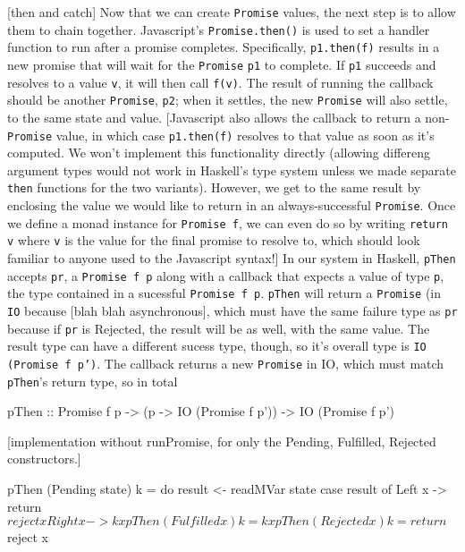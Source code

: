 \documentclass[12pt, english, letterpaper]{kuthesis}
\newcommand{\lit}[1]{\texttt{#1}}
\begin{document}
[then and catch]
Now that we can create \lit{Promise} values, the next step is to allow them to chain together.  Javascript's \lit{Promise.then()} is used to set a handler function to run after a promise completes.  Specifically, \lit{p1.then(f)} results in a new promise that will wait for the \lit{Promise} \lit{p1} to complete.  If \lit{p1} succeeds and resolves to a value \lit v, it will then call \lit{f(v)}.  The result of running the callback should be another \lit{Promise}, \lit{p2}; when it settles, the new \lit{Promise} will also settle, to the same state and value.
[Javascript also allows the callback to return a non-\lit{Promise} value, in which case \lit{p1.then(f)} resolves to that value as soon as it's computed.  We won't implement this functionality directly
(allowing differeng argument types would not work in Haskell's type system unless we made separate \lit{then} functions for the two variants).  However, we get to the same result by enclosing the value we would like to return in an always-successful \lit{Promise}.  Once we define a monad instance for \lit{Promise f}, we can even do so by writing \lit{return v} where \lit{v} is the value for the final promise to resolve to, which should look familiar to anyone used to the Javascript syntax!]
In our system in Haskell, \lit{pThen} accepts \lit{pr}, a \lit{Promise f p} along with a callback that expects a value of type \lit p, the type contained in a sucessful \lit{Promise f p}.  \lit{pThen} will return a \lit{Promise} (in \lit{IO} because [blah blah asynchronous], which must have the same failure type as \lit{pr} because if \lit{pr} is Rejected, the result will be as well, with the same value.  The result type can have a different sucess type, though, so it's overall type is \lit{IO (Promise f p')}.  The callback returns a new \lit{Promise} in IO, which must match \lit{pThen}'s return type, so in total
\begin{code}
pThen :: Promise f p
        -> (p -> IO (Promise f p'))
        -> IO (Promise f p')
\end{code}
[implementation without runPromise, for only the Pending, Fulfilled, Rejected constructors.]
\begin{code}
pThen (Pending state) k = do
  result <- readMVar state
  case result of
    Left x -> return $ reject x
    Right x -> k x
pThen (Fulfilled x) k = k x
pThen (Rejected x) k = return $ reject x
\end{code}
      
\end{document}

